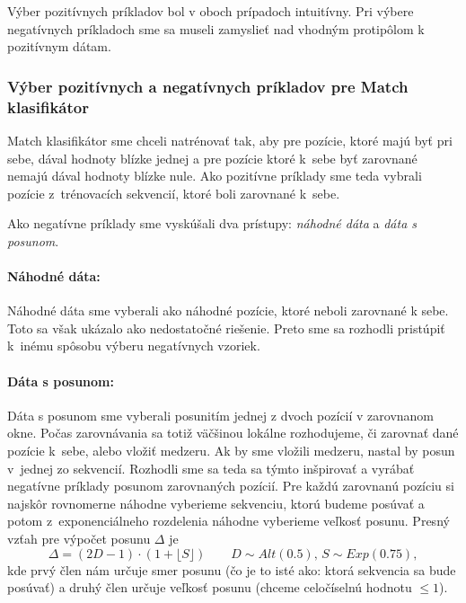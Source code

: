 Výber pozitívnych príkladov bol v oboch prípadoch intuitívny. Pri výbere negatívnych príkladoch sme sa museli zamyslieť nad vhodným protipôlom k pozitívnym dátam.

\subsubsection{Výber pozitívnych a negatívnych príkladov pre Match klasifikátor}

Match klasifikátor sme chceli natrénovať tak, aby pre pozície, ktoré majú byť pri sebe, dával hodnoty blízke jednej a pre pozície ktoré k~sebe byť zarovnané nemajú dával hodnoty blízke nule.
Ako pozitívne príklady sme teda vybrali pozície z~trénovacích sekvencií, ktoré boli zarovnané k~sebe.

Ako negatívne príklady sme vyskúšali dva prístupy: \textit{náhodné dáta} a \textit{dáta s posunom}.

\paragraph{Náhodné dáta:} Náhodné dáta sme vyberali ako náhodné pozície, ktoré neboli zarovnané k sebe. Toto sa však ukázalo ako nedostatočné riešenie.
Preto sme sa rozhodli pristúpiť k~inému spôsobu výberu negatívnych vzoriek.

\paragraph{Dáta s posunom:} Dáta s posunom sme vyberali posunitím jednej z dvoch pozícií v zarovnanom okne.
Počas zarovnávania sa totiž väčšinou lokálne rozhodujeme, či zarovnať dané pozície k~sebe, alebo vložiť medzeru. Ak by sme vložili medzeru, nastal by posun v~jednej zo sekvencií. Rozhodli sme sa teda sa týmto inšpirovať a vyrábať negatívne príklady posunom zarovnaných pozícií. Pre každú zarovnanú pozíciu si najskôr rovnomerne náhodne vyberieme sekvenciu, ktorú budeme posúvať a potom z~exponenciálneho rozdelenia náhodne vyberieme veľkosť posunu. Presný vzťah pre výpočet posunu $\Delta$ je
$$\Delta = \left(2D-1\right)\cdot \left(1+\lfloor S\rfloor\right)\qquad D\sim Alt(0.5),\, S\sim Exp(0.75),$$
kde prvý člen nám určuje smer posunu (čo je to isté ako: ktorá sekvencia sa bude posúvať) a druhý člen určuje veľkosť posunu (chceme celočíselnú hodnotu $\leq 1$).

